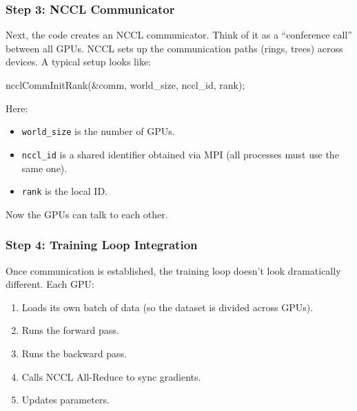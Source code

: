 \documentclass[
  letterpaper,
  DIV=11,
  numbers=noendperiod]{scrreprt}
\newenvironment{Shaded}{\begin{snugshade}}{\end{snugshade}}
\newcommand{\NormalTok}[1]{\textcolor[rgb]{0.00,0.23,0.31}{#1}}
\newcommand{\OperatorTok}[1]{\textcolor[rgb]{0.37,0.37,0.37}{#1}}
\providecommand{\tightlist}{%
  \setlength{\itemsep}{0pt}\setlength{\parskip}{0pt}}
\begin{document}
\subsubsection{Step 3: NCCL
Communicator}\label{step-3-nccl-communicator}

Next, the code creates an NCCL communicator. Think of it as a
``conference call'' between all GPUs. NCCL sets up the communication
paths (rings, trees) across devices. A typical setup looks like:

\begin{Shaded}
\begin{Highlighting}[]
\NormalTok{ncclCommInitRank}\OperatorTok{(\&}\NormalTok{comm}\OperatorTok{,}\NormalTok{ world\_size}\OperatorTok{,}\NormalTok{ nccl\_id}\OperatorTok{,}\NormalTok{ rank}\OperatorTok{);}
\end{Highlighting}
\end{Shaded}

Here:

\begin{itemize}
\tightlist
\item
  \texttt{world\_size} is the number of GPUs.
\item
  \texttt{nccl\_id} is a shared identifier obtained via MPI (all
  processes must use the same one).
\item
  \texttt{rank} is the local ID.
\end{itemize}

Now the GPUs can talk to each other.

\subsubsection{Step 4: Training Loop
Integration}\label{step-4-training-loop-integration}

Once communication is established, the training loop doesn't look
dramatically different. Each GPU:

\begin{enumerate}
\def\labelenumi{\arabic{enumi}.}
\tightlist
\item
  Loads its own batch of data (so the dataset is divided across GPUs).
\item
  Runs the forward pass.
\item
  Runs the backward pass.
\item
  Calls NCCL All-Reduce to sync gradients.
\item
  Updates parameters.
\end{enumerate}
\end{document}

